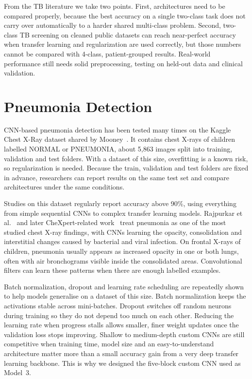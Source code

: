 From the TB literature we take two points. First, architectures need to be compared properly, because the best accuracy on a single two-class task does not carry over automatically to a harder shared multi-class problem. Second, two-class TB screening on cleaned public datasets can reach near-perfect accuracy when transfer learning and regularization are used correctly, but those numbers cannot be compared with 4-class, patient-grouped results. Real-world performance still needs solid preprocessing, testing on held-out data and clinical validation.

\section{Pneumonia Detection}

CNN-based pneumonia detection has been tested many times on the Kaggle Chest X-Ray dataset shared by Mooney~\cite{mooney2018}. It contains chest X-rays of children labelled NORMAL or PNEUMONIA, about 5,863 images split into training, validation and test folders. With a dataset of this size, overfitting is a known risk, so regularization is needed. Because the train, validation and test folders are fixed in advance, researchers can report results on the same test set and compare architectures under the same conditions.

Studies on this dataset regularly report accuracy above 90\%, using everything from simple sequential CNNs to complex transfer learning models. Rajpurkar et al.~\cite{rajpurkar2017} and later CheXpert-related work~\cite{irvin2019} treat pneumonia as one of the most studied chest X-ray findings, with CNNs learning the opacity, consolidation and interstitial changes caused by bacterial and viral infection. On frontal X-rays of children, pneumonia usually appears as increased opacity in one or both lungs, often with air bronchograms visible inside the consolidated areas. Convolutional filters can learn these patterns when there are enough labelled examples.

Batch normalization, dropout and learning rate scheduling are repeatedly shown to help models generalise on a dataset of this size. Batch normalization keeps the activations stable across mini-batches. Dropout switches off random neurons during training so they do not depend too much on each other. Reducing the learning rate when progress stalls allows smaller, finer weight updates once the validation loss stops improving. Shallow to medium-depth custom CNNs are still competitive when training time, model size and an easy-to-understand architecture matter more than a small accuracy gain from a very deep transfer learning backbone. This is why we designed the five-block custom CNN used as Model~3.


